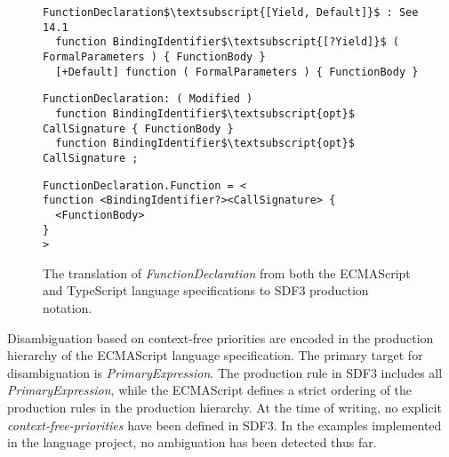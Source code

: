 \begin{figure*}
  \begin{lstlisting}[caption=Definition of \textit{FunctionDeclaration} in the ECMAScript language specification,mathescape]
FunctionDeclaration$\textsubscript{[Yield, Default]}$ : See 14.1
  function BindingIdentifier$\textsubscript{[?Yield]}$ ( FormalParameters ) { FunctionBody }
  [+Default] function ( FormalParameters ) { FunctionBody }
  \end{lstlisting}
  \begin{lstlisting}[caption=Definition of \textit{FunctionDeclaration} in the TypeScript language specification,mathescape]
FunctionDeclaration: ( Modified )
  function BindingIdentifier$\textsubscript{opt}$ CallSignature { FunctionBody }
  function BindingIdentifier$\textsubscript{opt}$ CallSignature ;
  \end{lstlisting}
  \begin{lstlisting}[caption=Definition of \textit{FunctionDeclaration} in SDF3 production notation]
FunctionDeclaration.Function = <
function <BindingIdentifier?><CallSignature> {
  <FunctionBody>
}
>
  \end{lstlisting}
  \caption{The translation of \textit{FunctionDeclaration} from both the ECMAScript and TypeScript language specifications to SDF3 production notation.}
  \label{fig:override-syntax}
\end{figure*}

Disambiguation based on context-free priorities are encoded in the production hierarchy of the ECMAScript language specification.
The primary target for disambiguation is \textit{PrimaryExpression}.
The production rule in SDF3 includes all \textit{PrimaryExpression}, while the ECMAScript defines a strict ordering of the production rules in the production hierarchy.
At the time of writing, no explicit \textit{context-free-priorities} have been defined in SDF3.
In the examples implemented in the language project, no ambiguation has been detected thus far.
